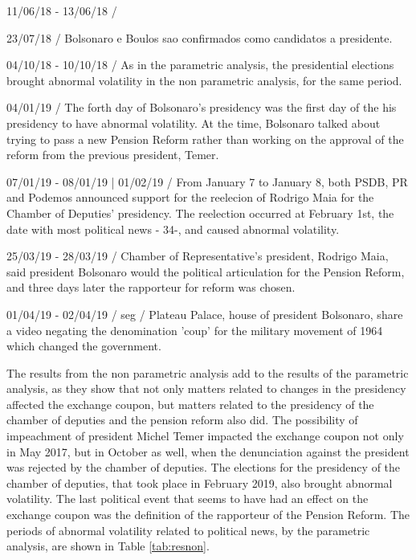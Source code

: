 \documentclass[a4paper]{article}
\begin{document}
11/06/18 - 13/06/18 /

23/07/18 / Bolsonaro e Boulos sao confirmados como candidatos a presidente.

04/10/18 - 10/10/18 / As in the parametric analysis, the presidential elections brought abnormal volatility in the non parametric analysis, for the same period.

04/01/19 / The forth day of Bolsonaro's presidency was the first day of the his presidency to have abnormal volatility. At the time, Bolsonaro talked about trying to pass a new Pension Reform rather than working on the approval of the reform from the previous president, Temer.

07/01/19 - 08/01/19 | 01/02/19 / From January 7 to January 8, both PSDB, PR and Podemos announced support for the reelecion of Rodrigo Maia for the Chamber of Deputies' presidency. The reelection occurred at February 1st, the date with most political news - 34-, and caused abnormal volatility.

25/03/19 - 28/03/19 / Chamber of Representative's president, Rodrigo Maia, said president Bolsonaro would the political articulation for the Pension Reform, and three days later the rapporteur for reform was chosen.

01/04/19 - 02/04/19 / seg / Plateau Palace, house of president Bolsonaro, share a video negating the denomination 'coup' for the military movement of 1964 which changed the government.

The results from the non parametric analysis add to the results of the parametric analysis, as they show that not only matters related to changes in the presidency affected the exchange coupon, but matters related to the presidency of the chamber of deputies and the pension reform also did. The possibility of impeachment of president Michel Temer impacted the exchange coupon not only in May 2017, but in October as well, when the denunciation against the president was rejected by the chamber of deputies. The elections for the presidency of the chamber of deputies, that took place in February 2019, also brought abnormal volatility. The last political event that seems to have had an effect on the exchange coupon was the definition of the rapporteur of the Pension Reform. The periods of abnormal volatility related to political news, by the parametric analysis, are shown in Table \ref{tab:resnon}.
\end{document}
